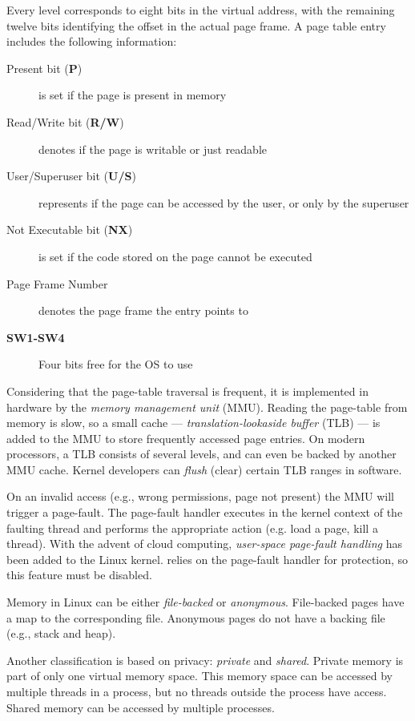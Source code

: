 Every level corresponds to eight bits in the virtual address, with the remaining twelve
bits identifying the offset in the actual page frame. A page table entry
includes the following information:
\begin{description}
    \item[Present bit (\textbf{P})] is set if the page is present in memory
    \item[Read/Write bit (\textbf{R/W})] denotes if the page is writable or just
         readable
    \item[User/Superuser bit (\textbf{U/S})] represents if the page can be 
    accessed by the user, or only by the superuser
    \item[Not Executable bit (\textbf{NX})] is set if the code stored on the 
    page cannot be executed
    \item[Page Frame Number] denotes the page frame the entry points to
    \item[\textbf{SW1-SW4}] Four bits free for the OS to use
\end{description}

Considering that the page-table traversal is frequent, it is implemented in
hardware by the \emph{memory management unit} (MMU). Reading the page-table from
memory is slow, so a small cache --- \emph{translation-lookaside buffer} (TLB)
--- is added to the MMU to store frequently accessed page entries. On modern
processors, a TLB consists of several levels, and can even be backed by another
MMU cache. Kernel developers can \emph{flush} (clear) certain TLB ranges in
software.

On an invalid access (e.g., wrong permissions, page not present) the MMU will
trigger a page-fault. The page-fault handler executes in the kernel context of
the faulting thread and performs the appropriate action (e.g. load a page, kill
a thread). With the advent of cloud computing, \emph{user-space page-fault
handling} has been added to the Linux kernel. \sysname relies on the page-fault
handler for protection, so this feature must be disabled.

Memory in Linux can be either \emph{file-backed} or \emph{anonymous}.
File-backed pages have a map to the corresponding file. Anonymous pages do not
have a backing file (e.g., stack and heap).

Another classification is based on privacy: \emph{private} and \emph{shared}. 
Private memory is part of only one virtual memory space. This memory space can 
be accessed by multiple threads in a process, but no threads outside the process
have access. Shared memory can be accessed by multiple processes.

